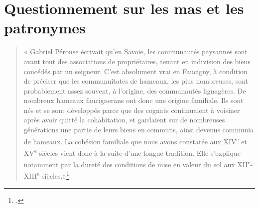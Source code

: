 \documentclass[12pt,a4paper]{report}
\begin{document}
	


\section{Questionnement sur les mas et les patronymes}

	\begin{quote}
	« Gabriel Pérouse écrivait qu’en Savoie, les communautés paysannes sont avant tout des associations de propriétaires, tenant en indivision des biens concédés par un seigneur. C’est absolument vrai en Faucigny, à condition de préciser que les communuitates de hameaux, les plus nombreuses, sont probablement assez souvent, à l’origine, des communautés lignagères. De nombreux hameaux faucignerans ont donc une origine familiale. Ils sont nés et se sont développés parce que des cognats continuaient à voisiner après avoir quitté la cohabitation, et gardaient sur de nombreuses générations une partie de leurs biens en communs, ainsi devenus communia de hameaux. La cohésion familiale que nous avons constatée aux XIV\textsuperscript{e} et XV\textsuperscript{e} siècles vient donc à la suite d’une longue tradition. Elle s’explique notamment par la dureté des conditions de mise en valeur du sol aux XII\textsuperscript{e}-XIII\textsuperscript{e} siècles.»\footcite[248]{Carrier2001VieMontagnardeFaucigny}
\end{quote}
\end{document}
